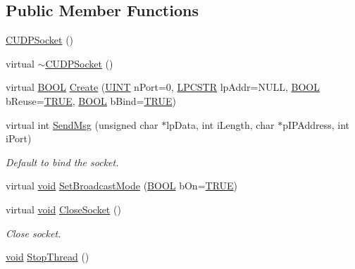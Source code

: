 \subsection*{\-Public \-Member \-Functions}
\begin{DoxyCompactItemize}
\item 
\hyperlink{class_c_u_d_p_socket_aef5d2a06cf56ee8887f320e60078a82a}{\-C\-U\-D\-P\-Socket} ()
\item 
virtual \hyperlink{class_c_u_d_p_socket_a39013172842e53b7ea8ab7c4b6a9db34}{$\sim$\-C\-U\-D\-P\-Socket} ()
\item 
virtual \hyperlink{_cpclient_8h_a3be13892ae7076009afcf121347dd319}{\-B\-O\-O\-L} \hyperlink{class_c_u_d_p_socket_a6c89fafe2db1d38396deb319b753e429}{\-Create} (\hyperlink{_x_plat_8h_a45c20c14d3d8790a22153d08ab2eb2ff}{\-U\-I\-N\-T} n\-Port=0, \hyperlink{_x_plat_8h_a2b72c6037793f6c6381a09c83f27569b}{\-L\-P\-C\-S\-T\-R} lp\-Addr=\-N\-U\-L\-L, \hyperlink{_cpclient_8h_a3be13892ae7076009afcf121347dd319}{\-B\-O\-O\-L} b\-Reuse=\hyperlink{_x_plat_8h_aa8cecfc5c5c054d2875c03e77b7be15d}{\-T\-R\-U\-E}, \hyperlink{_cpclient_8h_a3be13892ae7076009afcf121347dd319}{\-B\-O\-O\-L} b\-Bind=\hyperlink{_x_plat_8h_aa8cecfc5c5c054d2875c03e77b7be15d}{\-T\-R\-U\-E})
\item 
virtual int \hyperlink{class_c_u_d_p_socket_aa2aae315397cc5b53080ca816f148729}{\-Send\-Msg} (unsigned char $\ast$lp\-Data, int i\-Length, char $\ast$p\-I\-P\-Address, int i\-Port)
\begin{DoxyCompactList}\small\item\em \-Default to bind the socket. \end{DoxyCompactList}\item 
virtual \hyperlink{_cpclient_8h_a6464f7480a0fd0ee170cba12b2c0497f}{void} \hyperlink{class_c_u_d_p_socket_a175b7da28268a52de47ec103775e77aa}{\-Set\-Broadcast\-Mode} (\hyperlink{_cpclient_8h_a3be13892ae7076009afcf121347dd319}{\-B\-O\-O\-L} b\-On=\hyperlink{_x_plat_8h_aa8cecfc5c5c054d2875c03e77b7be15d}{\-T\-R\-U\-E})
\item 
virtual \hyperlink{_cpclient_8h_a6464f7480a0fd0ee170cba12b2c0497f}{void} \hyperlink{class_c_u_d_p_socket_a4c3f6638dc3c4cbe3ea33ab8b1dd811c}{\-Close\-Socket} ()
\begin{DoxyCompactList}\small\item\em \-Close socket. \end{DoxyCompactList}\item 
\hyperlink{_cpclient_8h_a6464f7480a0fd0ee170cba12b2c0497f}{void} \hyperlink{class_c_u_d_p_socket_aa48bf25adb1041c5f616fe5687607f6f}{\-Stop\-Thread} ()
\end{DoxyCompactItemize}
